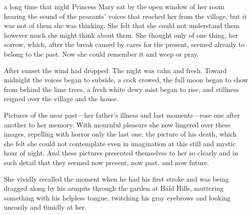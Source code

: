  a long time that night Princess Mary sat by the open window
of her room hearing the sound of the peasants' voices that
reached her from the village, but it was not of them she was
thinking. She felt that she could not understand them however
much she might think about them. She thought only of one thing,
her sorrow, which, after the break caused by cares for the
present, seemed already to belong to the past. Now she could
remember it and weep or pray.

After sunset the wind had dropped. The night was calm and
fresh. Toward midnight the voices began to subside, a cock
crowed, the full moon began to show from behind the lime trees, a
fresh white dewy mist began to rise, and stillness reigned over
the village and the house.

Pictures of the near past---her father's illness and last
moments---rose one after another to her memory. With mournful
pleasure she now lingered over these images, repelling with
horror only the last one, the picture of his death, which she
felt she could not contemplate even in imagination at this still
and mystic hour of night. And these pictures presented themselves
to her so clearly and in such detail that they seemed now
present, now past, and now future.

She vividly recalled the moment when he had his first stroke and
was being dragged along by his armpits through the garden at Bald
Hills, muttering something with his helpless tongue, twitching
his gray eyebrows and looking uneasily and timidly at her.

